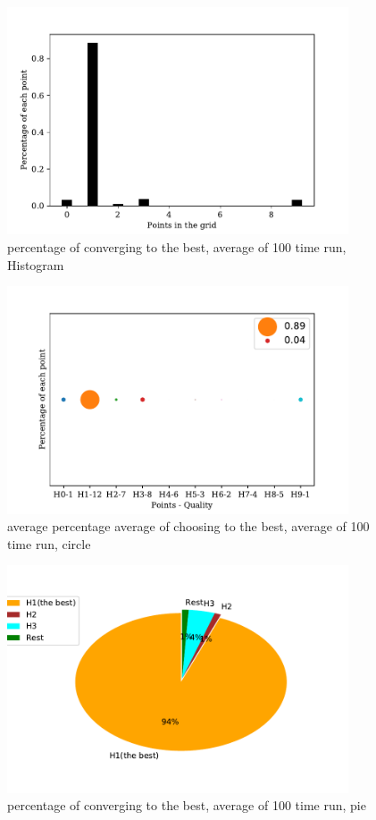 \documentclass[a4paper,12pt]{article}
\begin{document}
	\begin{figure}[H]
		\centering
		\includegraphics[width=0.9\textwidth]{average_percentagenorm1_200_3000_100}
		\caption{percentage of converging to the best, average of 100 time run, Histogram}\label{average_percentagenorm1_200_3000_100}
	\end{figure}
	\begin{figure}[H]
		\centering
		\includegraphics[width=0.9\textwidth]{Average_percentagenorm1_200_3000_100_2}
		\caption{average percentage average of choosing to the best, average of 100 time run, circle}\label{Average_percentagenorm1_200_3000_100_2}
	\end{figure}
	\begin{figure}[H]
		\centering
		\includegraphics[width=0.9\textwidth]{average_percentagenorm1_200_3000_100_3}
		\caption{percentage of converging to the best, average of 100 time run, pie}\label{average_percentagenorm1_200_3000_100_3}
	\end{figure}
	
\end{document}
